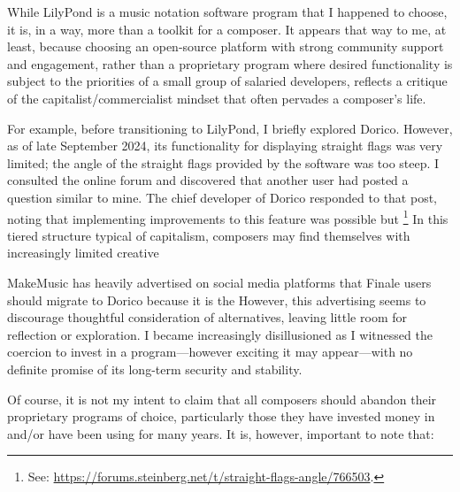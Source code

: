 While LilyPond is  a music notation software program that I happened to choose, it is, in a way, more than a toolkit for a composer. It appears that way to me, at least, because choosing an open-source platform with strong community support and engagement, rather than a proprietary program where desired functionality is subject to the priorities of a small group of salaried developers, reflects a critique of the capitalist/commercialist mindset that often pervades a composer’s life.
  
For example, before transitioning to LilyPond, I briefly explored Dorico. However, as of late September 2024, its functionality for displaying straight flags was very limited; the angle of the straight flags provided by the software was too steep. I consulted the online forum and discovered that another user had posted a question similar to mine. The chief developer of Dorico responded to that post, noting that implementing improvements to this feature was possible but \footnote{See: \url{https://forums.steinberg.net/t/straight-flags-angle/766503}.} In this tiered structure typical of capitalism, composers may find themselves with increasingly limited creative  

MakeMusic has heavily advertised on social media platforms that Finale users should migrate to Dorico because it is the  However, this advertising seems to discourage thoughtful consideration of alternatives, leaving little room for reflection or exploration. I became increasingly disillusioned as I witnessed the coercion to invest in a program—however exciting it may appear—with no definite promise of its long-term security and stability.

Of course, it is not my intent to claim that all composers should abandon their proprietary programs of choice, particularly those they have invested money in and/or have been using for many years. It is, however, important to note that: 

